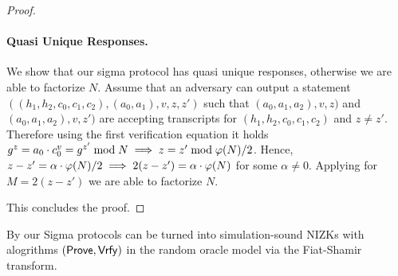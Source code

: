 \begin{proof}
\paragraph{Quasi Unique Responses.} We show that our sigma protocol has quasi unique responses, otherwise we are able to factorize $N$. Assume that an adversary can output a statement $((h_1, h_2, c_0, c_1, c_2), (a_0, a_1), v, z, z')$ such that $(a_0, a_1, a_2), v, z)$ and $(a_0, a_1, a_2), v, z')$ are accepting transcripts for $(h_1, h_2, c_0, c_1, c_2)$ and $z \neq z'$. Therefore using the first verification equation it holds $g^z = a_0 \cdot c_0^v = g^{z'} \bmod N \implies z = z' \bmod \varphi(N)/2$. Hence, $z-z' = \alpha \cdot \varphi(N)/2 \implies 2(z-z') = \alpha \cdot \varphi(N) $ for some $\alpha \neq 0$. Applying  for $M=2(z-z')$ we are able to factorize $N$.

This concludes the proof.
\end{proof}

By  our Sigma protocols can be turned into simulation-sound NIZKs with alogrithms $(\mathsf{Prove}, \mathsf{Vrfy})$ in the random oracle model via the Fiat-Shamir transform. 




